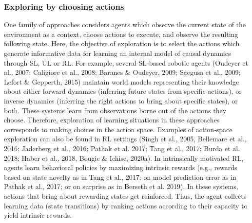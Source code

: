 \subsubsection{Exploring by choosing actions}
One family of approaches considers agents which observe the current state of the environment as a context, choose actions to execute, and observe the resulting following state. Here, the objective of exploration is to select the actions which generate informative data for learning an internal model of causal dynamics through SL, UL or RL. For example, several SL-based robotic agents (Oudeyer et al., 2007; Caligiore et al., 2008; Baranes \& Oudeyer, 2009; Saegusa et al., 2009; Lefort \& Gepperth, 2015) maintain world models representing their knowledge about either forward dynamics (inferring future states from specific actions), or inverse dynamics (inferring the right actions to bring about specific states), or both. These systems learn from observations borne out of the actions they choose. Therefore, exploration of learning situations in these approaches corresponds to making choices in the action space. Examples of action-space exploration can also be found in RL settings (Singh et al., 2005, Bellemare et al., 2016; Jaderberg et al., 2016; Pathak et al. 2017; Tang et al., 2017; Burda et al. 2018; Haber et al., 2018, Bougie \& Ichise, 2020a). In intrinsically motivated RL, agents learn behavioral policies by maximizing intrinsic rewards (e.g., rewards based on state novelty as in Tang et al., 2017; on model prediction error as in Pathak et al., 2017; or on surprise as in Berseth et al. 2019). In these systems, actions that bring about rewarding states get reinforced. Thus, the agent collects learning data (state transitions) by ranking actions according to their capacity to yield intrinsic rewards. 

